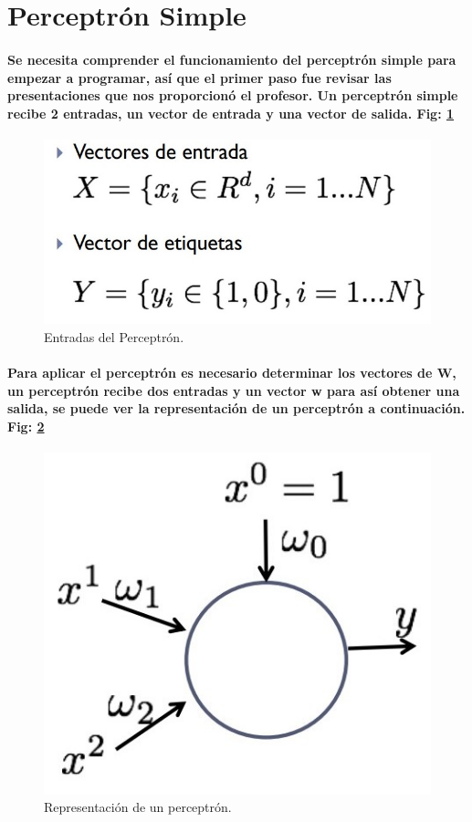 \documentclass[10pt,a4paper]{article}
\begin{document}
\printindex

\section{
Perceptr\'on Simple
}
\paragraph{Se necesita comprender el funcionamiento del perceptr\'on simple para empezar a programar, as\'i que el primer paso fue revisar las presentaciones que nos proporcion\'o el profesor. Un perceptr\'on simple recibe 2 entradas, un vector de entrada y una vector de salida. Fig: \ref{fig:Eperceptron}}

\begin{figure}[h]
\includegraphics[scale=0.4] {Eperceptron.jpg}
\caption{Entradas del Perceptr\'on.}
\label{fig:Eperceptron}
\end{figure}

\paragraph{Para aplicar el perceptr\'on es necesario determinar los vectores de W, un perceptr\'on recibe dos entradas y un vector w para as\'i obtener una salida, se puede ver la representaci\'on de un perceptr\'on a continuaci\'on. Fig: \ref{fig:Rperceptron} }

\begin{figure}[h]
\includegraphics[scale=0.4] {RepPerc.jpg}
\caption{Representaci\'on de un perceptr\'on.}
\label{fig:Rperceptron}
\end{figure}
\end{document}
